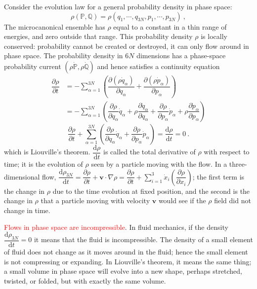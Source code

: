 \documentclass[12pt,a4paper]{article}
\renewcommand{\vec}[1]{\boldsymbol{#1}}
\newcommand{\dif}{\mathrm{d}}
\newcounter{theo}[section]\setcounter{theo}{0}
\begin{document}
Consider the evolution law for a general probability density in phase space:
\begin{equation}
\rho(\mathbb P, \mathbb Q) = \rho(q_1, \cdots, q_{3N}, p_1, \cdots, p_{3N}) ~,
\end{equation}
The microcanonical ensemble has $\rho$ equal to a constant in a thin range of energies, and zero outside that range. This
probability density $\rho$ is locally conserved: probability cannot be created or destroyed, it can only flow around in phase space. The probability density in $6N$ dimensions has a phase-space probability current $(\rho \dot{\mathbb P}, \rho \dot{\mathbb Q})$ and hence satisfies a continuity equation
\begin{align}
\nonumber \dfrac{\partial \rho}{\partial t} &= -\sum_{\alpha = 1}^{3N} \left(\dfrac{\partial (\rho \dot{q}_\alpha)}{\partial q_\alpha} +\dfrac{\partial (\rho \dot{p}_\alpha)}{\partial p_\alpha} \right) \\
\nonumber &= -\sum_{\alpha = 1}^{3N} \left(\dfrac{\partial \rho}{\partial q_\alpha} \dot{q}_\alpha + \rho\dfrac{\partial \dot{q}_\alpha}{\partial q_\alpha} +\dfrac{\partial \rho}{\partial p_\alpha} \dot{p}_\alpha + \rho \dfrac{\partial \dot{p}_\alpha}{\partial p_\alpha} \right) 
\end{align}
\begin{equation}
\dfrac{\partial \rho}{\partial t} +\sum_{\alpha = 1}^{3N} \left(\dfrac{\partial \rho}{\partial q_\alpha} \dot{q}_\alpha +\dfrac{\partial \rho}{\partial p_\alpha} \dot{p}_\alpha \right) = \dfrac{\dif \rho}{\dif t} = 0 ~.
\end{equation}
which is Liouville's theorem. $\dfrac{\dif \rho}{\dif t}$ is called the total derivative of $\rho$ with respect to time; it is the evolution
of $\rho$ seen by a particle moving with the flow. In a three-dimensional flow, $\dfrac{\dif \rho_{3N}}{\dif t} = \dfrac{\partial \rho}{\partial t} + \vec{v}\cdot \nabla \rho = \dfrac{\partial \rho}{\partial t} +\sum\limits_{i=1}^3 \dot{x}_i \left(\dfrac{\partial \rho}{\partial x_i} \right)$; the first term is the change in $\rho$ due to the time evolution at fixed position, and the second is the change in $\rho$ that a particle moving with velocity $\vec{v}$ would see if the $\rho$ field did not change in time.

\textcolor{red}{Flows in phase space are incompressible}. In fluid mechanics, if the density $\dfrac{\dif \rho_{3N}}{\dif t} = 0$ it means that the fluid is incompressible. The density of a small element of fluid does not change as it moves around in the fluid; hence the small element is not compressing or expanding. In Liouville's theorem, it means the same thing; a small volume in phase space will evolve into a new shape, perhaps stretched, twisted, or folded, but with exactly the same volume.
\end{document}
